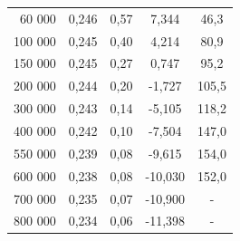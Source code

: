 \documentclass[a4paper, czech]{article}
\begin{document}
\begin{table}[H]
\begin{tabular}{rcccc}
        60 000      & 0,246                                                                       & 0,57                           & 7,344                                                        & 46,3                                                        \\
        100 000     & 0,245                                                                       & 0,40                           & 4,214                                                        & 80,9                                                        \\
        150 000     & 0,245                                                                       & 0,27                           & 0,747                                                        & 95,2                                                        \\
        200 000     & 0,244                                                                       & 0,20                           & -1,727                                                       & 105,5                                                       \\
        300 000     & 0,243                                                                       & 0,14                           & -5,105                                                       & 118,2                                                       \\
        400 000     & 0,242                                                                       & 0,10                           & -7,504                                                       & 147,0                                                       \\
        550 000     & 0,239                                                                       & 0,08                           & -9,615                                                       & 154,0                                                       \\
        600 000     & 0,238                                                                       & 0,08                           & -10,030                                                      & 152,0                                                       \\
        700 000     & 0,235                                                                       & 0,07                           & -10,900                                                      & -                                                           \\
        800 000     & 0,234                                                                       & 0,06                           & -11,398                                                      & -                                                           \\
        \bottomrule
    \end{tabular}
\end{table}
\end{document}
